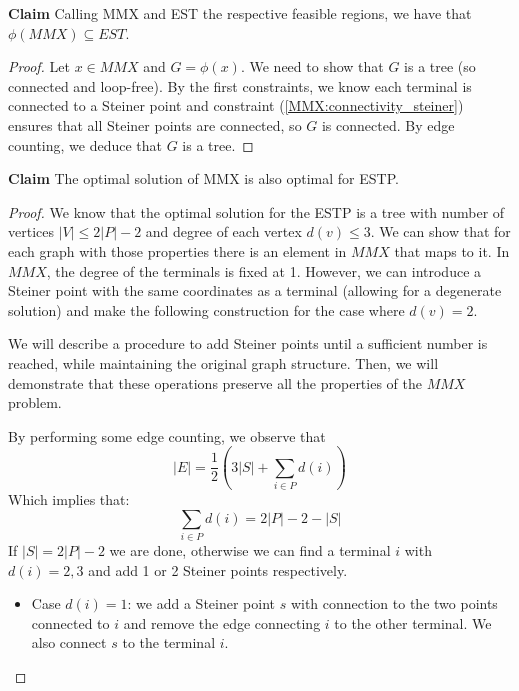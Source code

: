 \documentclass{article}
\begin{document}
    \textbf{Claim} Calling MMX and EST the respective feasible regions, we have that $\phi(MMX) \subseteq EST$.

    \begin{proof}
        Let $x \in MMX$ and $G = \phi(x)$. We need to show that $G$ is a tree (so connected and loop-free).
        By the first constraints, we know each terminal is connected to a Steiner point and constraint (\ref{MMX:connectivity_steiner}) ensures that
        all Steiner points are connected, so $G$ is connected.
        By edge counting, we deduce that $G$ is a tree.
    \end{proof}



    \textbf{Claim} The optimal solution of MMX is also optimal for ESTP.

    \begin{proof}
        We know that the optimal solution for the ESTP is a tree with number of vertices $|V| \le 2|P| - 2$ and degree of each vertex $d(v) \le 3$.
        We can show that for each graph with those properties there is an element in $MMX$ that maps to it.
        In $MMX$, the degree of the terminals is fixed at 1. However, we can introduce a Steiner point with the
        same coordinates as a terminal (allowing for a degenerate solution) and make the following construction for the case where $d(v) = 2$.

        We will describe a procedure to add Steiner points until a sufficient number is reached, while maintaining
        the original graph structure. Then, we will demonstrate that these operations preserve all the properties of the $MMX$ problem.

        By performing some edge counting, we observe that
        \begin{equation}
            |E| = \frac{1}{2} \left( 3|S| + \sum_{i \in P} d(i) \right)
        \end{equation}
        Which implies that:
        \begin{equation}
            \sum_{i \in P} d(i) = 2|P| - 2 - |S|
        \end{equation}
        If $|S| = 2|P| - 2$ we are done, otherwise we can find a terminal $i$ with $d(i) = 2,3$ and add 1 or 2 Steiner points respectively.
        \begin{itemize}

            \item Case $d(i) = 1 $: we add a Steiner point $s$ with connection to the two points connected to $i$ and remove the edge
            connecting $i$ to the other terminal. We also connect $s$ to the terminal $i$.


\end{itemize}
\end{proof}
\end{document}
